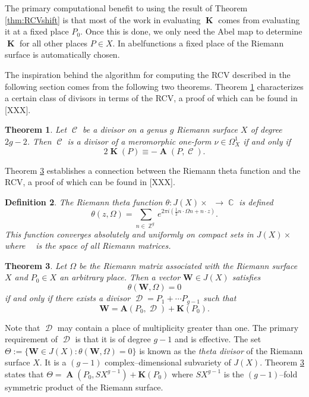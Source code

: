 \documentclass[12pt]{article}
\newtheorem{theorem}{Theorem}
\newtheorem{definition}[theorem]{Definition}
\theoremstyle{definition}
\DeclareMathOperator{\ZZ}{\mathbb{Z}}
\DeclareMathOperator{\CC}{\mathbb{C}}
\DeclareMathOperator{\hg}{\mathfrak{h}_g}
\DeclareMathOperator{\DivC}{\mathcal{C}}
\DeclareMathOperator{\DivD}{\mathcal{D}}
\DeclareMathOperator{\RCV}{\boldsymbol{K}}
\DeclareMathOperator{\Abel}{\boldsymbol{A}}
\begin{document}
The primary computational benefit to using the result of Theorem
\ref{thm:RCVshift} is that most of the work in evaluating $\RCV$ comes
from evaluating it at a fixed place $P_0$. Once this is done, we only
need the Abel map to determine $\RCV$ for all other places $P \in X$. In
{\sc abelfunctions} a fixed place of the Riemann surface is
automatically chosen.

The inspiration behind the algorithm for computing the RCV described in
the following section comes from the following two theorems. Theorem
\ref{thm:rcvequiv} characterizes a certain class of divisors in terms of
the RCV, a proof of which can be found in \cite{FarkasKra92}[XXX].
\begin{theorem} \label{thm:rcvequiv}
  Let $\DivC$ be a divisor on a genus $g$ Riemann surface $X$ of degree
  $2g - 2$. Then $\DivC$ is a divisor of a meromorphic one-form $\nu \in
  \Omega_X^1$ if and only if
  \begin{equation} \label{eqn:rcvequiv}
    2\RCV(P) \equiv -\Abel(P,\DivC).
  \end{equation}
\end{theorem}
\noindent Theorem \ref{thm:thetadivisor} establishes a connection
between the Riemann theta function and the RCV, a proof of which can be
found in [XXX].
\begin{definition} \label{def:riemanntheta}
  The Riemann theta function $\theta: J(X) \times \hg \to \CC$ is
  defined
  \begin{equation} \label{eqn:riemanntheta}
    \theta(z,\Omega)
    =
    \sum_{n \in \ZZ^g}
    e^{2 \pi i \left( \tfrac{1}{2} n \cdot \Omega n + n \cdot z \right)}.
  \end{equation}
  This function converges absolutely and uniformly on compact sets in
  $J(X) \times \hg$ where $\hg$ is the space of all Riemann matrices.
\end{definition}

\begin{theorem} \label{thm:thetadivisor}
  Let $\Omega$ be the Riemann matrix associated with the Riemann surface
  $X$ and $P_0 \in X$ an arbitrary place. Then a vector $\boldsymbol{W}
  \in J(X)$ satisfies
  \begin{equation} \label{eqn:thetadivisor1}
    \theta(\boldsymbol{W}, \Omega) = 0
  \end{equation}
  if and only if there exists a divisor $\DivD = P_1 + \cdots P_{g-1}$
  such that
  \begin{equation} \label{eqn:thetadivisor2}
    \boldsymbol{W} = \boldsymbol{A}(P_0, \DivD) + \boldsymbol{K}(P_0).
  \end{equation}
\end{theorem}
Note that $\DivD$ may contain a place of multiplicity greater than
one. The primary requirement of $\DivD$ is that it is of degree $g-1$
and is effective. The set $\Theta := \{ \boldsymbol{W} \in J(X) :
\theta(\boldsymbol{W},\Omega) = 0\}$ is known as the {\it theta divisor}
of the Riemann surface $X$. It is a $(g-1)$ complex--dimensional
subvariety of $J(X)$. Theorem \ref{thm:thetadivisor} states that $\Theta
= \Abel\left(P_0,SX^{g-1}\right) + \boldsymbol{K}(P_0)$ where $SX^{g-1}$
is the $(g-1)$--fold symmetric product of the Riemann surface.
\end{document}
